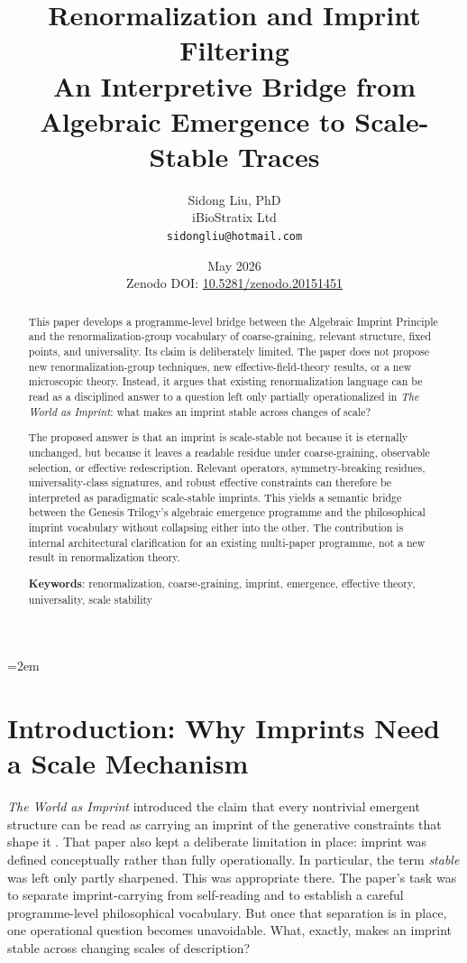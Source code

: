 \documentclass[12pt]{article}
\title{%
  \textbf{Renormalization and Imprint Filtering}\\
  \textbf{An Interpretive Bridge from Algebraic Emergence to Scale-Stable Traces}%
}
\author{
  Sidong Liu, PhD \\
  \small iBioStratix Ltd \\
  \small \texttt{sidongliu@hotmail.com}
}
\date{May 2026\\
\small Zenodo DOI: \href{https://doi.org/10.5281/zenodo.20151451}{10.5281/zenodo.20151451}}
\begin{document}
\emergencystretch=2em
\raggedbottom
{}

\maketitle

\begin{abstract}
This paper develops a programme-level bridge between the Algebraic Imprint Principle and the renormalization-group vocabulary of coarse-graining, relevant structure, fixed points, and universality. Its claim is deliberately limited. The paper does not propose new renormalization-group techniques, new effective-field-theory results, or a new microscopic theory. Instead, it argues that existing renormalization language can be read as a disciplined answer to a question left only partially operationalized in \emph{The World as Imprint}: what makes an imprint stable across changes of scale?

The proposed answer is that an imprint is scale-stable not because it is eternally unchanged, but because it leaves a readable residue under coarse-graining, observable selection, or effective redescription. Relevant operators, symmetry-breaking residues, universality-class signatures, and robust effective constraints can therefore be interpreted as paradigmatic scale-stable imprints. This yields a semantic bridge between the Genesis Trilogy's algebraic emergence programme and the philosophical imprint vocabulary without collapsing either into the other. The contribution is internal architectural clarification for an existing multi-paper programme, not a new result in renormalization theory.

\medskip

\noindent\textbf{Keywords}: renormalization, coarse-graining, imprint, emergence, effective theory, universality, scale stability
\end{abstract}

\clearpage
\tableofcontents
\clearpage

\section{Introduction: Why Imprints Need a Scale Mechanism}

\emph{The World as Imprint} introduced the claim that every nontrivial emergent structure can be read as carrying an imprint of the generative constraints that shape it \cite{WorldImprint}. That paper also kept a deliberate limitation in place: imprint was defined conceptually rather than fully operationally. In particular, the term \emph{stable} was left only partly sharpened. This was appropriate there. The paper's task was to separate imprint-carrying from self-reading and to establish a careful programme-level philosophical vocabulary. But once that separation is in place, one operational question becomes unavoidable. What, exactly, makes an imprint stable across changing scales of description?
\end{document}
